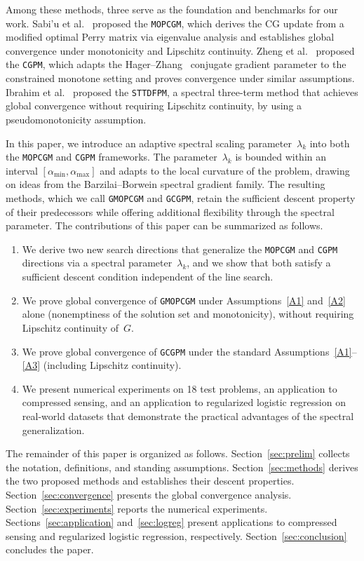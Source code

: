 \documentclass{article}
\theoremstyle{plain}
\theoremstyle{definition}
\theoremstyle{remark}
\newcommand{\algoname}[1]{{\small\texttt{#1}}}
\newcommand{\GMOPCGM}{\algoname{GMOPCGM}}
\newcommand{\GCGPM}{\algoname{GCGPM}}
\newcommand{\MOPCGM}{\algoname{MOPCGM}}
\newcommand{\CGPM}{\algoname{CGPM}}
\newcommand{\STTDFPM}{\algoname{STTDFPM}}
\begin{document}
Among these methods, three serve as the foundation and benchmarks for our work. Sabi'u et al.~\cite{sabi2023modified} proposed the \MOPCGM, which derives the CG update from a modified optimal Perry matrix via eigenvalue analysis and establishes global convergence under monotonicity and Lipschitz continuity. Zheng et al.~\cite{zheng2020conjugate} proposed the \CGPM, which adapts the Hager--Zhang~\cite{hager2005new} conjugate gradient parameter to the constrained monotone setting and proves convergence under similar assumptions. Ibrahim et al.~\cite{ibrahim2023two} proposed the \STTDFPM, a spectral three-term method that achieves global convergence without requiring Lipschitz continuity, by using a pseudomonotonicity assumption.

In this paper, we introduce an adaptive spectral scaling parameter~$\lambda_k$ into both the \MOPCGM{} and \CGPM{} frameworks. The parameter~$\lambda_k$ is bounded within an interval $[\alpha_{\min}, \alpha_{\max}]$ and adapts to the local curvature of the problem, drawing on ideas from the Barzilai--Borwein spectral gradient family. The resulting methods, which we call \GMOPCGM{} and \GCGPM, retain the sufficient descent property of their predecessors while offering additional flexibility through the spectral parameter. The contributions of this paper can be summarized as follows.
\begin{enumerate}[label=(\roman*), nosep]
  \item We derive two new search directions that generalize the \MOPCGM{} and \CGPM{} directions via a spectral parameter~$\lambda_k$, and we show that both satisfy a sufficient descent condition independent of the line search.
  \item We prove global convergence of \GMOPCGM{} under Assumptions~\ref{A1} and~\ref{A2} alone (nonemptiness of the solution set and monotonicity), without requiring Lipschitz continuity of~$G$.
  \item We prove global convergence of \GCGPM{} under the standard Assumptions~\ref{A1}--\ref{A3} (including Lipschitz continuity).
  \item We present numerical experiments on 18 test problems, an application to compressed sensing, and an application to regularized logistic regression on real-world datasets that demonstrate the practical advantages of the spectral generalization.
\end{enumerate}

The remainder of this paper is organized as follows. Section~\ref{sec:prelim} collects the notation, definitions, and standing assumptions. Section~\ref{sec:methods} derives the two proposed methods and establishes their descent properties. Section~\ref{sec:convergence} presents the global convergence analysis. Section~\ref{sec:experiments} reports the numerical experiments. Sections~\ref{sec:application} and~\ref{sec:logreg} present applications to compressed sensing and regularized logistic regression, respectively. Section~\ref{sec:conclusion} concludes the paper.
\end{document}
